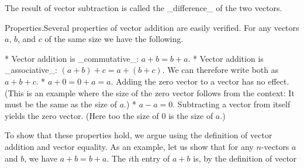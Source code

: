 The result of vector subtraction is called the _difference_ of the two vectors.

Properties.Several properties of vector addition are easily verified. For any vectors \(a\), \(b\), and \(c\) of the same size we have the following.

* Vector addition is _commutative_: \(a+b=b+a\).
* Vector addition is _associative_: \((a+b)+c=a+(b+c)\). We can therefore write both as \(a+b+c\).
* \(a+0=0+a=a\). Adding the zero vector to a vector has no effect. (This is an example where the size of the zero vector follows from the context: It must be the same as the size of \(a\).)
* \(a-a=0\). Subtracting a vector from itself yields the zero vector. (Here too the size of \(0\) is the size of \(a\).)

To show that these properties hold, we argue using the definition of vector addition and vector equality. As an example, let us show that for any \(n\)-vectors \(a\) and \(b\), we have \(a+b=b+a\). The \(i\)th entry of \(a+b\) is, by the definition of vector 